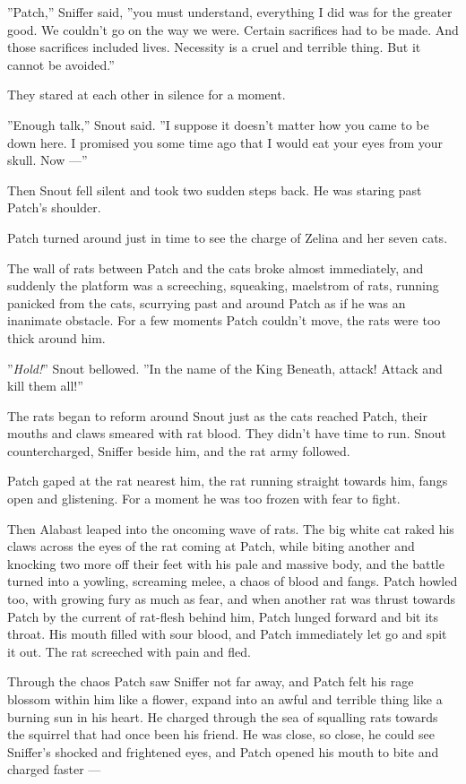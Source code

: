\documentclass[12pt]{book}
\begin{document}
''Patch,'' Sniffer said, ''you must understand, everything I did was
for the greater good. We couldn't go on the way we were. Certain
sacrifices had to be made. And those sacrifices included
lives. Necessity is a cruel and terrible thing. But it cannot be
avoided.''

They stared at each other in silence for a moment.

''Enough talk,'' Snout said. ''I suppose it doesn't matter how you
came to be down here. I promised you some time ago that I would eat
your eyes from your skull. Now ---''

Then Snout fell silent and took two sudden steps back. He was staring
past Patch's shoulder.

Patch turned around just in time to see the charge of Zelina and her
seven cats.

The wall of rats between Patch and the cats broke almost immediately,
and suddenly the platform was a screeching, squeaking, maelstrom of
rats, running panicked from the cats, scurrying past and around Patch
as if he was an inanimate obstacle. For a few moments Patch couldn't
move, the rats were too thick around him.

''\textit{Hold!}'' Snout bellowed. ''In the name of the King Beneath,
attack! Attack and kill them all!''

The rats began to reform around Snout just as the cats reached Patch,
their mouths and claws smeared with rat blood. They didn't have time
to run. Snout countercharged, Sniffer beside him, and the rat army
followed.

Patch gaped at the rat nearest him, the rat running straight towards
him, fangs open and glistening. For a moment he was too frozen with
fear to fight.

Then Alabast leaped into the oncoming wave of rats. The big white cat
raked his claws across the eyes of the rat coming at Patch, while
biting another and knocking two more off their feet with his pale and
massive body, and the battle turned into a yowling, screaming melee, a
chaos of blood and fangs. Patch howled too, with growing fury as much
as fear, and when another rat was thrust towards Patch by the current
of rat-flesh behind him, Patch lunged forward and bit its throat. His
mouth filled with sour blood, and Patch immediately let go and spit it
out. The rat screeched with pain and fled.

Through the chaos Patch saw Sniffer not far away, and Patch felt his
rage blossom within him like a flower, expand into an awful and
terrible thing like a burning sun in his heart. He charged through the
sea of squalling rats towards the squirrel that had once been his
friend. He was close, so close, he could see Sniffer's shocked and
frightened eyes, and Patch opened his mouth to bite and charged faster
---
\end{document}
